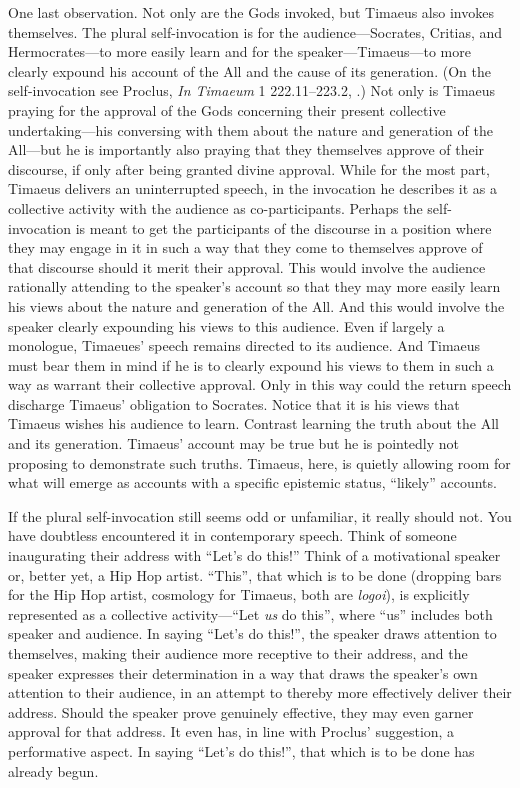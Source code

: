 One last observation. Not only are the Gods invoked, but Timaeus also invokes themselves. The plural self-invocation is for the audience---Socrates, Critias, and Herm\-ocrates---to more easily learn and for the speaker---Timaeus---to more clearly expound his account of the All and the cause of its generation. (On the self-invocation see Proclus, \emph{In Timaeum} 1 222.11--223.2, \citealt{Diehl:1903re}.) Not only is Timaeus praying for the approval of the Gods concerning their present collective undertaking---his conversing with them about the nature and generation of the All---but he is importantly also praying that they themselves approve of their discourse, if only after being granted divine approval. While for the most part, Timaeus delivers an uninterrupted speech, in the invocation he describes it as a collective activity with the audience as co-participants. Perhaps the self-invocation is meant to get the participants of the discourse in a position where they may engage in it in such a way that they come to themselves approve of that discourse should it merit their approval. This would involve the audience rationally attending to the speaker's account so that they may more easily learn his views about the nature and generation of the All. And this would involve the speaker clearly expounding his views to this audience. Even if largely a monologue, Timaeues' speech remains directed to its audience. And Timaeus must bear them in mind if he is to clearly expound his views to them in such a way as warrant their collective approval. Only in this way could the return speech discharge Timaeus' obligation to Socrates. Notice that it is his views that Timaeus wishes his audience to learn. Contrast learning the truth about the All and its generation. Timaeus' account may be true but he is pointedly not proposing to demonstrate such truths. Timaeus, here, is quietly allowing room for what will emerge as accounts with a specific epistemic status, ``likely'' accounts.

If the plural self-invocation still seems odd or unfamiliar, it really should not. You have doubtless encountered it in contemporary speech. Think of someone inaugurating their address with ``Let's do this!'' Think of a motivational speaker or, better yet, a Hip Hop artist. ``This'', that which is to be done (dropping bars for the Hip Hop artist, cosmology for Timaeus, both are \emph{logoi}), is explicitly represented as a collective activity---``Let \emph{us} do this'', where ``us'' includes both speaker and audience. In saying ``Let's do this!'', the speaker draws attention to themselves, making their audience more receptive to their address, and the speaker expresses their determination in a way that draws the speaker's own attention to their audience, in an attempt to thereby more effectively deliver their address. Should the speaker prove genuinely effective, they may even garner approval for that address. It even has, in line with Proclus' suggestion, a performative aspect. In saying ``Let's do this!'', that which is to be done has already begun.

